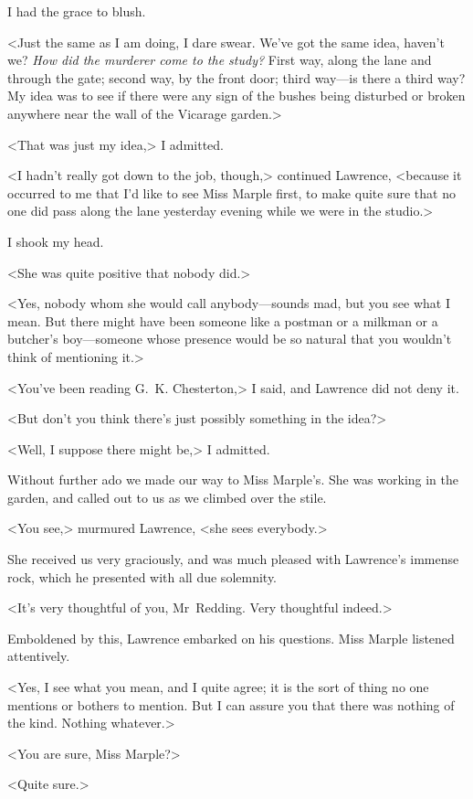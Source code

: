 I had the grace to blush.

<Just the same as I am doing, I dare swear. We've got the same idea, haven't we? \emph{How did the murderer come to the study?} First way, along the lane and through the gate; second way, by the front door; third way—is there a third way? My idea was to see if there were any sign of the bushes being disturbed or broken anywhere near the wall of the Vicarage garden.>

<That was just my idea,> I admitted.

<I hadn't really got down to the job, though,> continued Lawrence, <because it occurred to me that I'd like to see Miss Marple first, to make quite sure that no one did pass along the lane yesterday evening while we were in the studio.>

I shook my head.

<She was quite positive that nobody did.>

<Yes, nobody whom she would call anybody—sounds mad, but you see what I mean. But there might have been someone like a postman or a milkman or a butcher's boy—someone whose presence would be so natural that you wouldn't think of mentioning it.>

<You've been reading G.~K. Chesterton,> I said, and Lawrence did not deny it.

<But don't you think there's just possibly something in the idea?>

<Well, I suppose there might be,> I admitted.

Without further ado we made our way to Miss Marple's. She was working in the garden, and called out to us as we climbed over the stile.

<You see,> murmured Lawrence, <she sees everybody.>

She received us very graciously, and was much pleased with Lawrence's immense rock, which he presented with all due solemnity.

<It's very thoughtful of you, Mr~Redding. Very thoughtful indeed.>

Emboldened by this, Lawrence embarked on his questions. Miss Marple listened attentively.

<Yes, I see what you mean, and I quite agree; it is the sort of thing no one mentions or bothers to mention. But I can assure you that there was nothing of the kind. Nothing whatever.>

<You are sure, Miss Marple?>

<Quite sure.>

